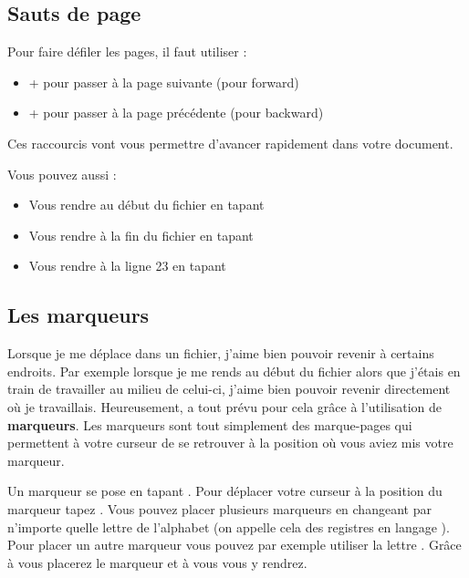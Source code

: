 \subsection{Sauts de page}

Pour faire défiler les pages, il faut utiliser :

\bigskip

\begin{itemize}
    \item \tctrl + \tf pour passer à la page suivante (\tf pour forward)
    \item \tctrl + \tb pour passer à la page précédente (\tb pour backward)
\end{itemize}

\bigskip

Ces raccourcis vont vous permettre d'avancer rapidement dans votre document. 

Vous pouvez aussi :

\begin{itemize}
    \item Vous rendre au début du fichier en tapant \tg\tg
    \item Vous rendre à la fin du fichier en tapant \tG
    \item Vous rendre à la ligne 23 en tapant \tcolon{}
\end{itemize}

\subsection{Les marqueurs}

Lorsque je me déplace dans un fichier, j'aime bien pouvoir revenir à certains endroits. Par exemple lorsque je me rends au début du fichier alors que j'étais en train de travailler au milieu de celui-ci, j'aime bien pouvoir revenir directement où je travaillais. Heureusement, \vim a tout prévu pour cela grâce à l'utilisation de \textbf{marqueurs}. Les marqueurs sont tout simplement des \og marque-pages \fg{} qui permettent à votre curseur de se retrouver à la position où vous aviez mis votre marqueur.

Un marqueur se pose en tapant \tm\ta. Pour déplacer votre curseur à la position du marqueur tapez \tapos\ta. Vous pouvez placer plusieurs marqueurs en changeant \ta par n'importe quelle lettre de l'alphabet (on appelle cela des registres en langage \vim). Pour placer un autre marqueur vous pouvez par exemple utiliser la lettre \td. Grâce à \tm\td\xspace vous placerez le marqueur et à \tapos\td\xspace vous vous y rendrez.

